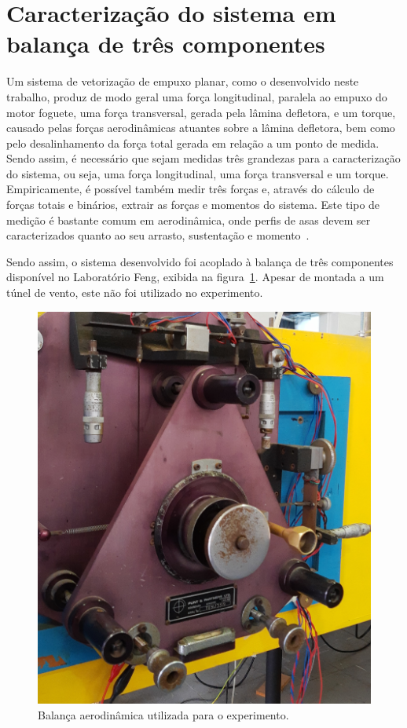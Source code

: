 \section{Caracterização do sistema em balança de três componentes}\label{sec:method_3axis_measurement}

Um sistema de vetorização de empuxo planar, como o desenvolvido neste trabalho, produz de modo geral uma força longitudinal, paralela ao empuxo do motor foguete, uma força transversal, gerada pela lâmina defletora, e um torque, causado pelas forças aerodinâmicas atuantes sobre a lâmina defletora, bem como pelo desalinhamento da força total gerada em relação a um ponto de medida. Sendo assim, é necessário que sejam medidas três grandezas para a caracterização do sistema, ou seja, uma força longitudinal, uma força transversal e um torque. Empiricamente, é possível também medir três forças e, através do cálculo de forças totais e binários, extrair as forças e momentos do sistema. Este tipo de medição é bastante comum em aerodinâmica, onde perfis de asas devem ser caracterizados quanto ao seu arrasto, sustentação e momento~\cite{anderson}.

Sendo assim, o sistema desenvolvido foi acoplado à balança de três componentes disponível no Laboratório Feng, exibida na figura~\ref{fig:3axis_scale}. Apesar de montada a um túnel de vento, este não foi utilizado no experimento.

\begin{figure}[htbp]
    \centering
    \includegraphics[width=\textwidth]{img/eixocropped.jpg}
    \caption{Balança aerodinâmica utilizada para o experimento.}\label{fig:3axis_scale}
\end{figure}

